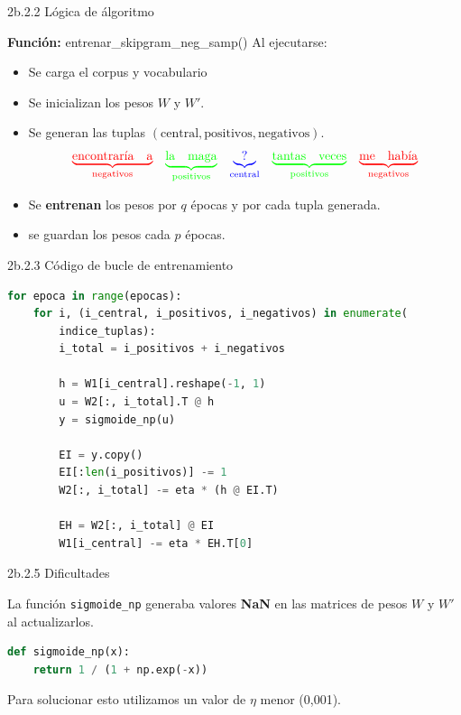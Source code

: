 \documentclass{beamer}
\begin{document}
\begin{frame}{2b.2.2 Lógica de álgoritmo}
	\begin{block}{\textbf{Función:} entrenar\_skipgram\_neg\_samp()}
		Al ejecutarse:
		\begin{itemize}
			\item Se carga el corpus y vocabulario
			\item Se inicializan los pesos $W$ y $W'$.
			\item Se generan las tuplas $(\text{central}, \text{positivos}, \text{negativos})$.
			\[
			\begin{array}{ccccc}
				\textcolor{red}{\underbrace{\text{encontraría}\quad \text{a}}_{\text{negativos}}} &
				\textcolor{green}{\underbrace{\text{la}\quad \text{maga}}_{\text{positivos}}} &
				\textcolor{blue}{\underbrace{\text{?}}_{\text{central}}} &
				\textcolor{green}{\underbrace{\text{tantas}\quad \text{veces}}_{\text{positivos}}} &
				\textcolor{red}{\underbrace{\text{me}\quad \text{había}}_{\text{negativos}}}
			\end{array}
			\]
			\item Se \textbf{entrenan} los pesos por $q$ épocas y por cada tupla generada.
			\item se guardan los pesos cada $p$ épocas.
		\end{itemize}
	\end{block}
	
\end{frame}

\begin{frame}[fragile]{2b.2.3 Código de bucle de entrenamiento}
	\justifying
	\begin{lstlisting}[language=Python]
for epoca in range(epocas):
	for i, (i_central, i_positivos, i_negativos) in enumerate(
		indice_tuplas):
		i_total = i_positivos + i_negativos
		
		h = W1[i_central].reshape(-1, 1)
		u = W2[:, i_total].T @ h
		y = sigmoide_np(u)
		
		EI = y.copy()
		EI[:len(i_positivos)] -= 1
		W2[:, i_total] -= eta * (h @ EI.T)
		
		EH = W2[:, i_total] @ EI
		W1[i_central] -= eta * EH.T[0]
	\end{lstlisting}
\end{frame}


\begin{frame}[fragile]{2b.2.5 Dificultades}
	\justifying
	\begin{block}{}
		La función \texttt{sigmoide\_np} generaba valores \textbf{NaN} en las matrices de pesos $W$ y $W'$ al actualizarlos.
	\end{block}
	
	\begin{lstlisting}[language=Python]
def sigmoide_np(x):
	return 1 / (1 + np.exp(-x))
	\end{lstlisting}
	
	\begin{block}{}
		Para solucionar esto utilizamos un valor de $\eta$ menor (0,001).
	\end{block}
	
	
	
\end{frame}
\end{document}
